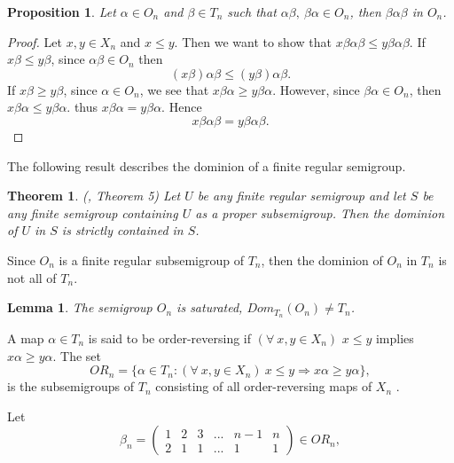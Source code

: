 \documentclass[10pt]{extarticle}
\numberwithin{equation}{section}
\numberwithin{bbb}{section}
\newtheorem{proposition}{Proposition}[section]
\newtheorem{theorem}{Theorem}[section]
\newtheorem{lemma}{Lemma}[section]
\numberwithin{equation}{section}
\begin{document}
\vspace{0.5cm}
\begin{proposition}
Let $\alpha \in O_n$ and $\beta \in T_n$ such that $\alpha\beta, \ \beta\alpha \in O_n$, then $\beta\alpha\beta$ in $O_n$. 
\end{proposition}  

\begin{proof}
Let $x,y \in X_n$ and $x\leq y$. Then we want to show that $x\beta\alpha\beta \leq y\beta\alpha\beta$. If $x\beta \leq y\beta$, since $\alpha\beta \in O_n$ then
$$(x\beta)\alpha\beta \leq (y\beta)\alpha\beta.$$
If $x\beta \geq y\beta$, since $\alpha \in O_n$, we see that $x\beta\alpha \geq y\beta\alpha.$
However, since $\beta\alpha \in O_n$, then $x\beta\alpha \leq y\beta\alpha.$
thus $x\beta\alpha=y\beta\alpha.$
Hence $$x\beta\alpha\beta=y\beta\alpha\beta.$$
\end{proof}

\vspace{0.2cm}
The following result describes the dominion of a finite regular semigroup.
\begin{theorem}(\cite{196}, Theorem 5)
 Let $U$ be any finite regular semigroup and let $S$ be any finite semigroup containing $U$ as a proper subsemigroup. Then the dominion of $U$ in $S$ is strictly contained in $S$.
\end{theorem}

\vspace{0.5cm}
Since $O_n$ is a finite regular subsemigroup of $T_n$, then  
the dominion of $O_n$ in $T_n$ is not all of $T_n$.
\begin{lemma}
    The semigroup $O_n$ is saturated, $Dom_{T_n}(O_n) \neq T_n$.
\end{lemma}


\vspace{0.4cm}
A map $\alpha \in T_n$ is said to be  order-reversing if $(\forall \ x,y \in X_n)$ $x \leq y$ implies $x\alpha \geq y\alpha$. The set
$$OR_n=\{\alpha \in T_n: (\forall \ x,y\in X_n) \ x \leq y \Rightarrow x\alpha\geq y\alpha\},$$  
is the subsemigroups of $T_n$ consisting of all  order-reversing maps of $X_n$ \cite{cla}. 

\vspace{0.2cm}
Let
$$\beta_{n}=\begin{pmatrix}  1&2&3&...&n-1&n\\2&1&1&...&1&1
\end{pmatrix} \in OR_n,$$
\end{document}
